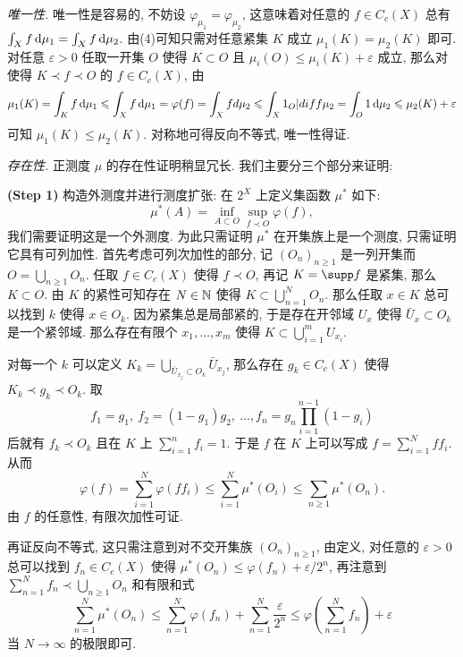 	\begin{Proof}
		\textsl{唯一性.} 唯一性是容易的, 不妨设 $ \varphi_{\mu_1}=\varphi_{\mu_2} $, 这意味着对任意的 $ f\in C_c(X) $ 总有 $ \int_Xf\,\mathrm{d}\mu_1=\int_Xf\,\mathrm{d}\mu_2 $. 由(4)可知只需对任意紧集 $ K $ 成立 $ \mu_1(K)=\mu_2(K) $ 即可. 对任意 $ \varepsilon>0 $ 任取一开集 $ O $ 使得 $ K\subset O $ 且 $ \mu_i(O)\leqslant\mu_i(K)+\varepsilon $ 成立, 那么对使得 $ K\prec f\prec O $ 的 $ f\in C_c(X) $, 由
		\[
			\mu_1(K)=\int_Kf\,\mathrm{d}\mu_1\leqslant\int_Xf\,\mathrm{d}\mu_1=\varphi(f)=\int_Xfd\mu_2\leqslant\int_X1_O|diff\mu_2=\int_O1\,\mathrm{d}\mu_2\leqslant\mu_2(K)+\varepsilon
		\]
		可知 $ \mu_1(K)\leqslant\mu_2(K) $. 对称地可得反向不等式, 唯一性得证.

		\textsl{存在性.} 正测度 $ \mu $ 的存在性证明稍显冗长. 我们主要分三个部分来证明:

		\textbf{(Step 1)} 构造外测度并进行测度扩张: 在 $ 2^X $ 上定义集函数 $ \mu^* $ 如下:
		\[
			\mu^*(A)=\inf_{A\subset O}\sup_{f\prec O}\varphi(f),
		\]
		我们需要证明这是一个外测度. 为此只需证明 $ \mu^* $ 在开集族上是一个测度, 只需证明它具有可列加性. 首先考虑可列次加性的部分, 记 $ (O_n)_{n\geqslant 1} $ 是一列开集而 $ O=\bigcup\limits_{n\geqslant 1}O_n $. 任取 $ f\in C_c(X) $ 使得 $ f\prec O $, 再记 $ K=\supp f $ 是紧集, 那么 $ K\subset O $. 由 $ K $ 的紧性可知存在 $ N\in\mathbb{N} $ 使得 $ K\subset\bigcup\limits_{n=1}^NO_n $. 那么任取 $ x\in K $ 总可以找到 $ k $ 使得 $ x\in O_k $. 因为紧集总是局部紧的, 于是存在开邻域 $ U_x $ 使得 $ \bar{U}_x\subset O_k $ 是一个紧邻域. 那么存在有限个 $ x_1,\dots,x_m $ 使得 $ K\subset\bigcup\limits_{i=1}^mU_{x_i} $.

		对每一个 $ k $ 可以定义 $ K_k=\bigcup\limits_{\bar{U}_{x_j}\subset O_k}\bar{U}_{x_j} $, 那么存在 $ g_k\in C_c(X) $ 使得 $ K_k\prec g_k\prec O_k $. 取
		\[
			f_1=g_1,\ f_2=(1-g_1)g_2,\ \dots, f_n=g_n\prod_{i=1}^{n-1}(1-g_i)
		\]
		后就有 $ f_k\prec O_k $ 且在 $ K $ 上 $ \sum\limits_{i=1}^nf_i=1 $. 于是 $ f $ 在 $ K $ 上可以写成 $ f=\sum\limits_{i=1}^Nff_i $. 从而
		\[
			\varphi(f)=\sum_{i=1}^N\varphi(ff_i)\leqslant\sum_{i=1}^N\mu^*(O_i)\leqslant\sum_{n\geqslant 1}\mu^*(O_n).
		\]
		由 $ f $ 的任意性, 有限次加性可证.

		再证反向不等式, 这只需注意到对不交开集族 $ (O_n)_{n\geqslant 1} $, 由定义, 对任意的 $ \varepsilon>0 $ 总可以找到 $ f_n\in C_c(X) $ 使得 $ \mu^*(O_n)\leqslant\varphi(f_n)+\varepsilon/2^n $, 再注意到 $ \sum\limits_{n=1}^Nf_n\prec \bigcup\limits_{n\geqslant 1}O_n $ 和有限和式
		\[
			\sum_{n=1}^N\mu^*(O_n)\leqslant\sum_{n=1}^N\varphi(f_n)+\sum_{n=1}^N\frac{\varepsilon}{2^n}\leqslant\varphi\left( \sum_{n=1}^Nf_n \right)+\varepsilon
		\]
		当 $ N\to\infty $ 的极限即可.


\end{Proof}
